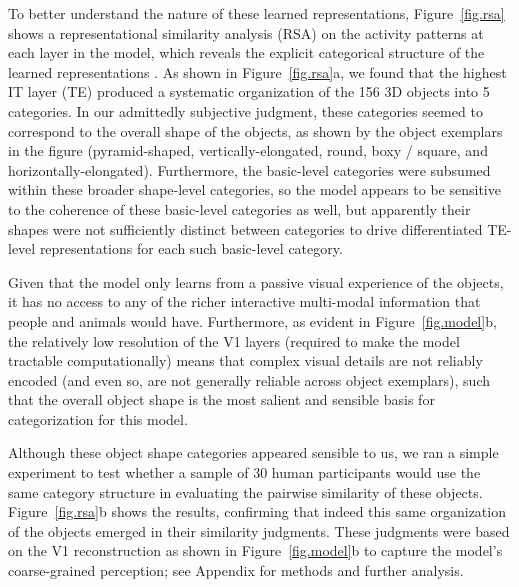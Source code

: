 \documentclass[11pt,twoside]{article}
\newif\myifpdf
\begin{document}
To better understand the nature of these learned representations, Figure~\ref{fig.rsa} shows a representational similarity analysis (RSA) on the activity patterns at each layer in the model, which reveals the explicit categorical structure of the learned representations \citep{KriegeskorteMurBandettini08,CadieuHongYaminsEtAl14}.  As shown in Figure~\ref{fig.rsa}a, we found that the highest IT layer (TE) produced a systematic organization of the 156 3D objects into 5 categories.  In our admittedly subjective judgment, these categories seemed to correspond to the overall shape of the objects, as shown by the object exemplars in the figure (pyramid-shaped, vertically-elongated, round, boxy / square, and horizontally-elongated).  Furthermore, the basic-level categories were subsumed within these broader shape-level categories, so the model appears to be sensitive to the coherence of these basic-level categories as well, but apparently their shapes were not sufficiently distinct between categories to drive differentiated TE-level representations for each such basic-level category.

Given that the model only learns from a passive visual experience of the objects, it has no access to any of the richer interactive multi-modal information that people and animals would have.  Furthermore, as evident in Figure~\ref{fig.model}b, the relatively low resolution of the V1 layers (required to make the model tractable computationally) means that complex visual details are not reliably encoded (and even so, are not generally reliable across object exemplars), such that the overall object shape is the most salient and sensible basis for categorization for this model.

Although these object shape categories appeared sensible to us, we ran a simple experiment to test whether a sample of 30 human participants would use the same category structure in evaluating the pairwise similarity of these objects.  Figure~\ref{fig.rsa}b shows the results, confirming that indeed this same organization of the objects emerged in their similarity judgments.  These judgments were based on the V1 reconstruction as shown in Figure~\ref{fig.model}b to capture the model's coarse-grained perception; see Appendix for methods and further analysis.
\end{document}
